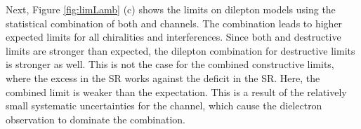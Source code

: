 Next, Figure \ref{fig:limLamb} (c) shows the limits on dilepton models using the statistical combination of both \ee and \mm channels.
The combination leads to higher expected limits for all chiralities and interferences.
Since both \ee and \mm destructive limits are stronger than expected, the dilepton combination for destructive limits is stronger as well.
This is not the case for the combined constructive limits, where the excess in the \ee SR works against the deficit in the \mm SR.
Here, the combined limit is weaker than the expectation.
This is a result of the relatively small systematic uncertainties for the \ee channel, which cause the dielectron observation to dominate the combination.

